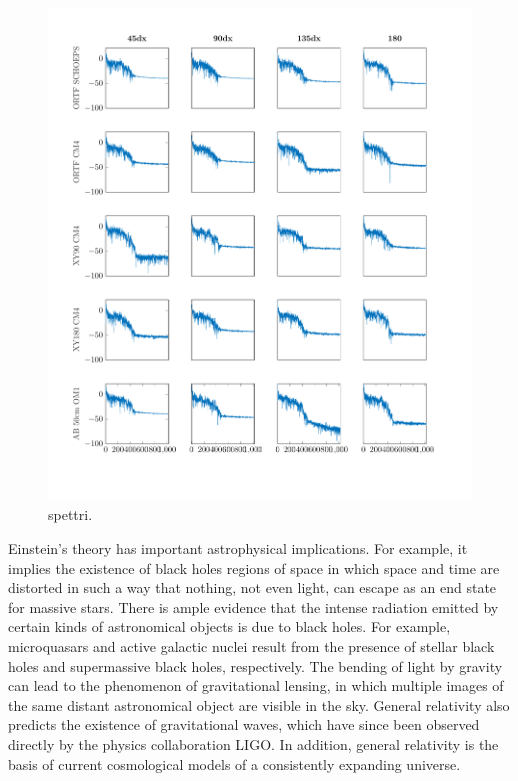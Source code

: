 \begin{figure}[t]
  \centering
  \includegraphics[width=.97\textwidth]{img/statistiche/pdf/spectra_2}
  \caption{spettri.}
  \label{spettri2}
\end{figure}

Einstein's theory has important astrophysical implications. For example, it
implies the existence of black holes regions of space in which space and time
are distorted in such a way that nothing, not even light, can escape as an
end state for massive stars. There is ample evidence that the intense radiation
emitted by certain kinds of astronomical objects is due to black holes. For
example, microquasars and active galactic nuclei result from the presence of
stellar black holes and supermassive black holes, respectively. The bending of
light by gravity can lead to the phenomenon of gravitational lensing, in which
multiple images of the same distant astronomical object are visible in the sky.
General relativity also predicts the existence of gravitational waves, which
have since been observed directly by the physics collaboration LIGO. In addition,
general relativity is the basis of current cosmological models of a consistently
expanding universe.


